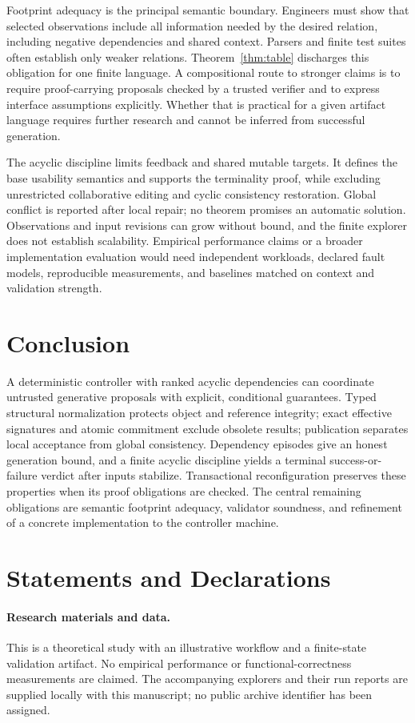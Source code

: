 \documentclass[pdflatex,sn-mathphys-num]{sn-jnl}
\theoremstyle{thmstyleone}
\theoremstyle{thmstylethree}
\theoremstyle{thmstyletwo}
\begin{document}
Footprint adequacy is the principal semantic boundary. Engineers must show that selected observations include all information needed by the desired relation, including negative dependencies and shared context. Parsers and finite test suites often establish only weaker relations. Theorem~\ref{thm:table} discharges this obligation for one finite language. A compositional route to stronger claims is to require proof-carrying proposals checked by a trusted verifier and to express interface assumptions explicitly. Whether that is practical for a given artifact language requires further research and cannot be inferred from successful generation.

The acyclic discipline limits feedback and shared mutable targets. It defines the base usability semantics and supports the terminality proof, while excluding unrestricted collaborative editing and cyclic consistency restoration. Global conflict is reported after local repair; no theorem promises an automatic solution. Observations and input revisions can grow without bound, and the finite explorer does not establish scalability. Empirical performance claims or a broader implementation evaluation would need independent workloads, declared fault models, reproducible measurements, and baselines matched on context and validation strength.

\section{Conclusion}
A deterministic controller with ranked acyclic dependencies can coordinate untrusted generative proposals with explicit, conditional guarantees. Typed structural normalization protects object and reference integrity; exact effective signatures and atomic commitment exclude obsolete results; publication separates local acceptance from global consistency. Dependency episodes give an honest generation bound, and a finite acyclic discipline yields a terminal success-or-failure verdict after inputs stabilize. Transactional reconfiguration preserves these properties when its proof obligations are checked. The central remaining obligations are semantic footprint adequacy, validator soundness, and refinement of a concrete implementation to the controller machine.

\section*{Statements and Declarations}
\paragraph{Research materials and data.} This is a theoretical study with an illustrative workflow and a finite-state validation artifact. No empirical performance or functional-correctness measurements are claimed. The accompanying explorers and their run reports are supplied locally with this manuscript; no public archive identifier has been assigned.
\end{document}
